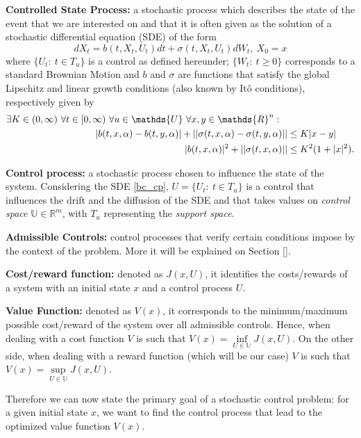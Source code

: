 \textbf{Controlled State Process:}  
a stochastic process which describes the state of the event that we are interested on and that it is often given as the solution of a stochastic differential equation (SDE) of the form
\begin{equation}
	d X_t=b(t,X_t,U_t)dt + \sigma (t,X_t,U_t)dW_t, \ X_0=x
	\label{bc_cp}
\end{equation}
where $\{U_t: \ t \in T_u\}$ is a control as defined hereunder; $\{W_t: \ t\geq 0\}$ corresponds to a standard Brownian Motion and $b$ and $\sigma$ are functions that satisfy the global Lipschitz and linear growth conditions (also known by Itô conditions), respectively given by
\begin{align}
\exists K \in (0,\infty) \  \forall t \in [0,\infty) \ \forall u \in \mathds{U} \ \forall x,y \in\mathds{R}^n: \hspace{3mm} \nonumber &\\
|b(t,x,\alpha)-b(t,y,\alpha)| + || \sigma (t,x,\alpha)- \sigma(t,y,\alpha)|| &\leq K |x-y| \label{bc_cond1} \\
|b(t,x,\alpha)|^2+|| \sigma (t,x,\alpha)|| &\leq K^2 (1+|x|^2).  \label{bc_cond2}
\end{align}


\textbf{Control process:}
a stochastic process chosen to influence the state of the system. Considering the SDE \eqref{bc_cp}, $U=\{U_t: \ t \in T_u\}$ is a control that influences the drift and the diffusion of the SDE and that takes values on \textit{control space} $\mathds{U} \in \mathds{R}^m$, with $T_u$ representing the \textit{support space}.


\textbf{Admissible Controls:}
control processes that verify certain conditions impose by the context of the problem. More it will be explained on Section \ref{}.


\textbf{Cost/reward function:} 
denoted as $J(x,U)$, it identifies the costs/rewards of a system with an initial state $x$ and a control process $U$.


\textbf{Value Function:}
denoted as $V(x)$, it corresponds to the minimum/maximum possible cost/reward of the system over all admissible controls. Hence, when dealing with a cost function $V$ is such that $V(x)= \underset{U\in \mathds{U}}{\inf} J(x,U)$. On the other side, when dealing with a reward function (which will be our case) $V$ is such that $V(x)= \underset{U\in \mathds{U}}{\sup} J(x,U)$.


Therefore we can now state the primary goal of a stochastic control problem: for a given initial state $x$, we want to find the control process that lead to the optimized value function $V(x)$.


